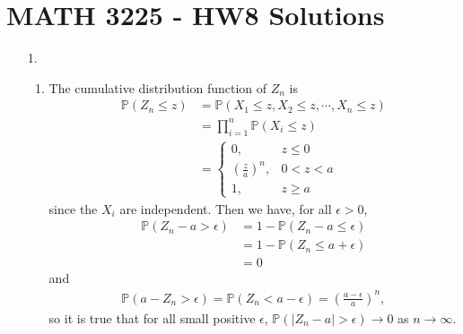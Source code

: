 \documentclass[a4paper,12pt]{article}
\begin{document}
\section*{MATH 3225 - HW8 Solutions}

\begin{enumerate}
    \item[1.]
        \begin{enumerate}
            \item
                The cumulative distribution function of $Z_n$ is
                \begin{align*}
                    \mathbb{P}(Z_n \leq z) &= \mathbb{P}(X_1 \leq z, X_2 \leq z, \cdots, X_n \leq z) \\
                    &= \prod_{i = 1}^n \mathbb{P}(X_i \leq z) \\
                    &=  \begin{cases}
                        0, &z \leq 0 \\
                        \left( \frac{z}{a} \right)^n, &0 < z < a \\
                        1, &z \geq a
                    \end{cases}
                \end{align*}
                since the $X_i$ are independent. Then we have, for all $\epsilon > 0$,
                \begin{align*}
                    \mathbb{P}(Z_n - a > \epsilon) &= 1 - \mathbb{P}(Z_n - a \leq \epsilon) \\
                    &= 1 - \mathbb{P}(Z_n \leq a + \epsilon) \\
                    &= 0
                \end{align*}
                and
                \begin{gather*}
                    \mathbb{P}(a - Z_n > \epsilon) = \mathbb{P}(Z_n < a - \epsilon) = \left( \frac{a - \epsilon}{a} \right)^n,
                \end{gather*}
                so it is true that for all small positive $\epsilon$, $\mathbb{P}(|Z_n - a| > \epsilon) \to 0$ as $n \to \infty$.


\end{enumerate}
\end{enumerate}
\end{document}
